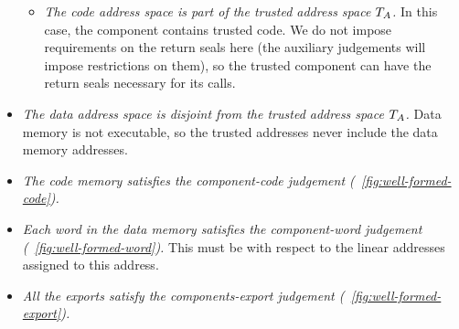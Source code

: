 \documentclass[acmsmall,screen]{acmart}\settopmatter{}
\newenvironment{jversion}%
    {\color{OliveGreen}}{}
\begin{document}
\begin{jversion}
\begin{itemize}
\begin{itemize}
  \item \textit{The code address space is part of the trusted address space $T_{A}$.} In this case, the component contains trusted code. We do not impose requirements on the return seals here (the auxiliary judgements will impose restrictions on them), so the trusted component can have the return seals necessary for its calls.
  \end{itemize}
\item \emph{The data address space is disjoint from the trusted address space $T_{A}$.} Data memory is not executable, so the trusted addresses never include the data memory addresses.
\item \textit{The code memory satisfies the component-code judgement (\figurename~\ref{fig:well-formed-code}).}
\item \textit{Each word in the data memory satisfies the component-word judgement (\figurename~\ref{fig:well-formed-word}).} This must be with respect to the linear addresses assigned to this address.
\item \textit{All the exports satisfy the components-export judgement (\figurename~\ref{fig:well-formed-export}).}
\end{itemize}


\end{jversion}
\end{document}
